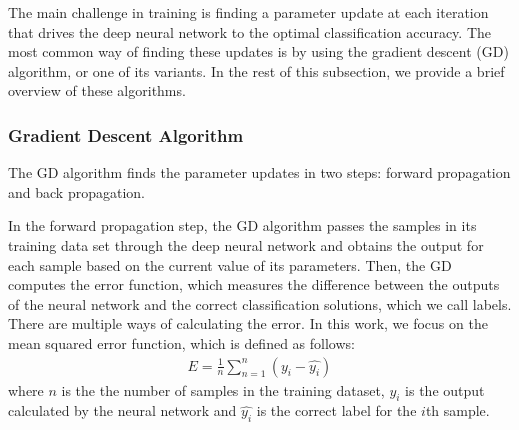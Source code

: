 \documentclass[letterpaper]{article}
\begin{document}
\begin{flushleft}
{%

The main challenge in training is finding a parameter update at each iteration that drives the deep neural network to the optimal
classification accuracy. The most common way of finding these updates is by using the gradient descent (GD) algorithm, or one of its
variants. In the rest of this subsection, we provide a brief overview of these algorithms. 


\subsubsection{Gradient Descent Algorithm}
The GD algorithm finds the parameter updates in two steps: forward propagation and back propagation. 

In the forward propagation step, the GD algorithm passes the samples in its training data set through the
deep neural network and obtains the output for each sample based on the current value of its parameters. Then, the GD computes the
error function, which measures the difference between the outputs of the neural network and the correct classification solutions,
which we call labels. There are multiple ways of calculating the error. In this work, we focus on the mean squared error function,
which is defined as follows:
\begin{align}\label{eq:errorFunction}
 E= \frac{1}{n} \sum_{n=1}^{n}(y_i -\hat{y_i})
\end{align}
where $n$ is the the number of samples in the training dataset, $y_i$ is the output calculated by the neural network and 
$\hat{y_i}$ is the correct label for the $i$th sample.


}
\end{flushleft}
\end{document}
